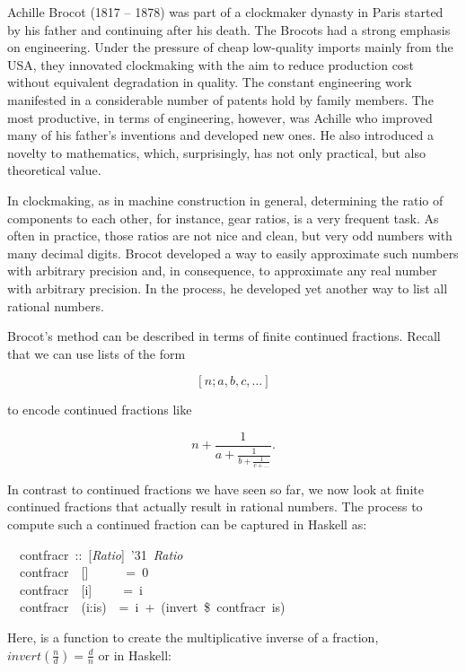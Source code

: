 \documentclass[tikz]{scrreprt}
\newcommand{\texfamily}{\fontfamily{cmtex}\selectfont}
\begin{document}
Achille Brocot (1817 -- 1878) was part of a clockmaker dynasty
in Paris started by his father and continuing after his death.
The Brocots had a strong emphasis on engineering.
Under the pressure of cheap low-quality imports
mainly from the USA, they
innovated clockmaking with the aim to reduce production cost
without equivalent degradation in quality.
The constant engineering work manifested in a considerable
number of patents hold by family members. The most productive,
in terms of engineering, however, was Achille who improved
many of his father's inventions and developed new ones.
He also introduced a novelty to mathematics, which, surprisingly,
has not only practical, but also theoretical value.

In clockmaking, as in machine construction in general,
determining the ratio of components to each other,
for instance, gear ratios, is a very frequent task.
As often in practice, those ratios are not nice and clean,
but very odd numbers with many decimal digits.
Brocot developed a way to easily approximate such numbers
with arbitrary precision and, in consequence, to approximate
any real number with arbitrary precision.
In the process, he developed yet another way 
to list all rational numbers.

Brocot's method can be described in terms 
of finite continued fractions. Recall that we can
use lists of the form

\[
[n;a,b,c,\dots]
\]

to encode continued fractions like

\[
n + \frac{1}{a+\frac{1}{b+\frac{1}{c+\dots}}}.
\]

In contrast to continued fractions we have seen so far,
we now look at finite continued fractions that actually
result in rational numbers. The process to compute
such a continued fraction can be captured in Haskell as:

\begin{minipage}{\textwidth}
\begin{tabbing}\texfamily
~~contfracr~::~[{\itshape Ratio}]~\char'31~{\itshape Ratio}\\
\texfamily ~~contfracr~~[]~~~~~~=~0\\
\texfamily ~~contfracr~~[i]~~~~~=~i~\\
\texfamily ~~contfracr~~(i:is)~~=~i~+~(invert~\$~contfracr~is)
\end{tabbing}
\end{minipage}

Here, \text{\texfamily invert} is a function to create the multiplicative
inverse of a fraction, \ie\ $invert(\frac{n}{d}) = \frac{d}{n}$
or in Haskell:
\end{document}
